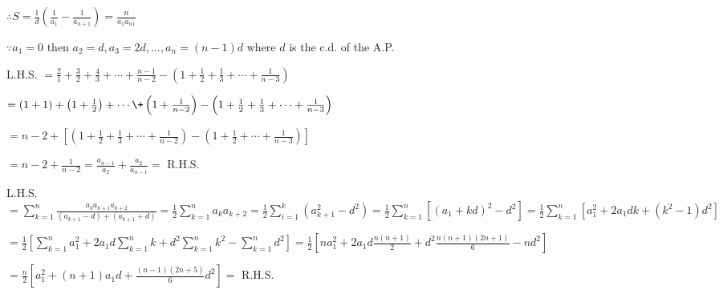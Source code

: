   $\therefore S = \frac{1}{d}\left(\frac{1}{a_1} - \frac{1}{a_{n + 1}}\right) = \frac{n}{a_1a_{n 1}}$
\item $\because a_1 = 0$ then $a_2 = d, a_3 = 2d, \ldots, a_n = (n - 1)d$ where $d$ is the c.d. of the A.P.

  L.H.S. $= \frac{2}{1} + \frac{3}{2} + \frac{4}{3} + \cdots + \frac{n - 1}{n - 2} - \left(1 + \frac{1}{2} +
  \frac{1}{3} + \cdots + \frac{1}{n - 3}\right)$

  $= (1 + 1) + \left(1 + \frac{1}{2}\right) + \cdots \+ \left(1 + \frac{1}{n - 2}\right) - \left(1 +
  \frac{1}{2} + \frac{1}{3} + \cdots + \frac{1}{n - 3}\right)$

  $= n - 2 + \left[\left(1 + \frac{1}{2} + \frac{1}{3} + \cdots + \frac{1}{n - 2}\right) - \left(1 +
    \frac{1}{2} + \cdots + \frac{1}{n - 3}\right)\right]$

  $= n - 2 + \frac{1}{n - 2} = \frac{a_{n - 1}}{a_2} + \frac{a_2}{a_{n - 1}} =$ R.H.S.
\item L.H.S. $= \displaystyle\sum_{k=1}^n\frac{a_ka_{k+1}a_{k+2}}{(a_{k + 1} - d) + (a_{k + 1} + d)} = \frac{1}{2}\sum_{k
  = 1}^na_ka_{k + 2} = \frac{1}{2}\sum_{i = 1}^k(a_{k + 1}^2 - d^2) = \frac{1}{2}\sum_{k = 1}^n[(a_1 + kd)^2 -
  d^2] = \frac{1}{2}\sum_{k = 1}^n[a_1^2 + 2a_1dk + (k^2 - 1)d^2]$

  $= \displaystyle\frac{1}{2}\left[\sum_{k = 1}^na_1^2 + 2a_1d\sum_{k = 1}^nk + d^2\sum_{k = 1}^nk^2 - \sum_{k = 1}^nd^2\right] =
  \frac{1}{2}\left[na_1^2 + 2a_1d\frac{n(n + 1)}{2} + d^2\frac{n(n + 1)(2n + 1)}{6} - nd^2\right]$

  $= \frac{n}{2}\left[a_1^2 + (n + 1)a_1d + \frac{(n - 1)(2n + 5)}{6}d^2\right] =$ R.H.S.
\stopitemize
